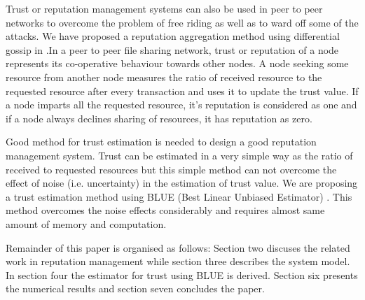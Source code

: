 \documentclass{IEEEtran}
\begin{document}
Trust or reputation management systems can also be used in peer to peer networks
to overcome the problem of free riding as well as to ward off some of the
attacks. We have proposed a reputation aggregation method using differential gossip
in \cite{ruchir}.In a peer to peer file sharing network, trust or reputation of a node
represents its co-operative behaviour towards other nodes. A node seeking some
resource from another node measures the ratio of received resource to the
requested resource after every transaction and uses it to update the trust
value. If  a node imparts all the requested resource, it's reputation is
considered as one and if a node always declines sharing of resources,
it has reputation as zero. 


Good method for trust estimation is needed to design a
good reputation management system. Trust can be estimated in a very simple way as the ratio of received to requested resources but this simple method can not
overcome the effect of noise (i.e. uncertainty) in the estimation of trust
value. We are proposing a trust estimation method using BLUE (Best Linear
Unbiased Estimator) \cite{blue}. This method overcomes the noise effects
considerably and requires almost same amount of memory and computation.

Remainder of this paper is organised as follows: Section two discuses the
related work in reputation management while section three describes the system model. In section four the estimator for trust using BLUE is derived. Section six presents the numerical results and section seven concludes the paper.
\end{document}
